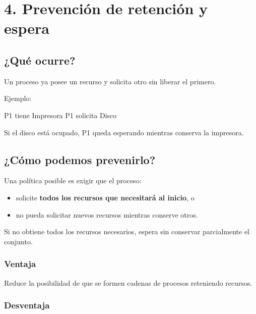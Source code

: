 \documentclass[
  spanish,
  letterpaper,
]{scrbook}
\newenvironment{Shaded}{\begin{snugshade}}{\end{snugshade}}
\newcommand{\NormalTok}[1]{\textcolor[rgb]{0.00,0.23,0.31}{#1}}
\providecommand{\tightlist}{%
  \setlength{\itemsep}{0pt}\setlength{\parskip}{0pt}}
\begin{document}
\chapter{4. Prevención de retención y
espera}\label{prevenciuxf3n-de-retenciuxf3n-y-espera}

\section{¿Qué ocurre?}\label{quuxe9-ocurre}

Un proceso ya posee un recurso y solicita otro sin liberar el primero.

Ejemplo:

\begin{Shaded}
\begin{Highlighting}[]
\NormalTok{P1 tiene Impresora}
\NormalTok{P1 solicita Disco}
\end{Highlighting}
\end{Shaded}

Si el disco está ocupado, P1 queda esperando mientras conserva la
impresora.

\section{¿Cómo podemos prevenirlo?}\label{cuxf3mo-podemos-prevenirlo}

Una política posible es exigir que el proceso:

\begin{itemize}
\tightlist
\item
  solicite \textbf{todos los recursos que necesitará al inicio}, o
\item
  no pueda solicitar nuevos recursos mientras conserve otros.
\end{itemize}

Si no obtiene todos los recursos necesarios, espera sin conservar
parcialmente el conjunto.

\subsection{Ventaja}\label{ventaja}

Reduce la posibilidad de que se formen cadenas de procesos reteniendo
recursos.

\subsection{Desventaja}\label{desventaja}
\end{document}
